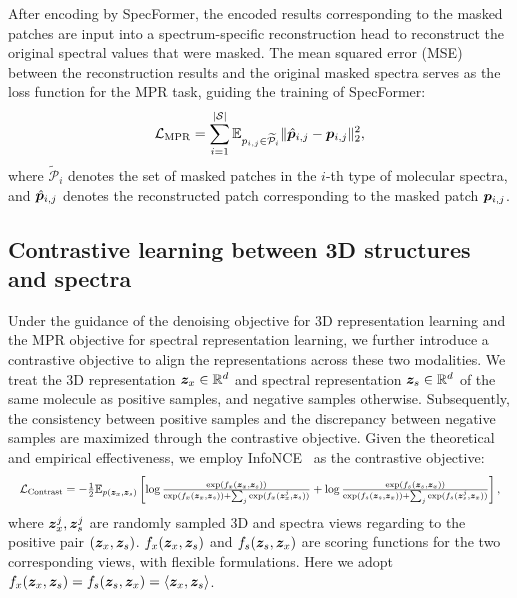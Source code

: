 After encoding by SpecFormer, the encoded results corresponding to the masked patches are input into a spectrum-specific reconstruction head to reconstruct the original spectral values that were masked. The mean squared error (MSE) between the reconstruction results and the original masked spectra serves as the loss function for the MPR task, guiding the training of SpecFormer:
\begin{equation}
\begin{aligned}
    \mathcal{L}_{\mathrm{MPR}} = \sum_{i=1}^{|\mathcal{S}|} \mathbb{E}_{p_{i,j} \in \widetilde{\mathcal{P}}_i} \|\hat{{\bm{p}}}_{i,j}- {\bm{p}}_{i,j}\|_2^2, 
\end{aligned}
\label{sce}
\end{equation}
where $\widetilde{\mathcal{P}}_i$ denotes the set of masked patches in the $i$-th type of molecular spectra, and $\hat{{\bm{p}}}_{i,j}$ denotes the reconstructed patch corresponding to the masked patch ${\bm{p}}_{i,j}$.

\subsection{Contrastive learning between 3D structures and spectra}

Under the guidance of the denoising objective for 3D representation learning and the MPR objective for spectral representation learning, we further introduce a contrastive objective to align the representations across these two modalities. We treat the 3D representation ${\bm{z}}_x \in \mathbb{R}^{d}$ and spectral representation ${\bm{z}}_s \in \mathbb{R}^{d}$ of the same molecule as positive samples, and negative samples otherwise. Subsequently, the consistency between positive samples and the discrepancy between negative samples are maximized through the contrastive objective. Given the theoretical and empirical effectiveness, we employ InfoNCE~\citep{InfoNCE} as the contrastive objective:
\begin{equation}
\resizebox{\textwidth}{!}{$
    \mathcal{L}_{\text{Contrast}} = -\frac{1}{2} \mathbb{E}_{p(\vz_x, \vz_s)} \left[ \log \frac{\exp(f_x(\vz_x, \vz_s))}{\exp(f_x(\vz_x, \vz_s)) + \sum_j \exp(f_x(\vz_x^j, \vz_s))} + \log \frac{\exp(f_s(\vz_s, \vz_x))}{\exp(f_s(\vz_s, \vz_x)) + \sum_j \exp(f_s(\vz_s^j, \vz_x))} \right],
$}
\label{eq:contrast}
\end{equation}
where ${\bm{z}}_x^j, {\bm{z}}_s^j$ are randomly sampled 3D and spectra views regarding to the positive pair $({\bm{z}}_x, {\bm{z}}_s)$. $f_x({\bm{z}}_x, {\bm{z}}_s)$ and $f_s({\bm{z}}_s, {\bm{z}}_x)$ are scoring functions for the two corresponding views, with flexible formulations. Here we adopt $f_x({\bm{z}}_x, {\bm{z}}_s) = f_s({\bm{z}}_s, {\bm{z}}_x) = \langle {\bm{z}}_x, {\bm{z}}_s \rangle$.

